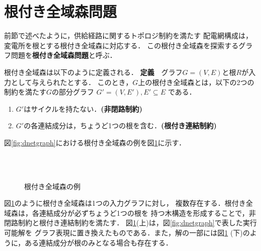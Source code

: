 \section{根付き全域森問題}\label{chap:problem}

前節で述べたように，供給経路に関するトポロジ制約を満たす
配電網構成は，変電所を根とする根付き全域森に対応する．
この根付き全域森を探索するグラフ問題を\textbf{根付き全域森問題}と呼ぶ．

根付き全域森は以下のように定義される．\cite{Minato:dnet:netuki}
\newline
\textbf{定義}~~グラフ$G=(V,E)$と根$R$が入力として与えられたとする．
このとき，$G$上の根付き全域森とは，以下の2つの制約を満たす$G$の部分グラフ
$G'=(V,E'), E' \subseteq E$ である．
\begin{enumerate}
 \item $G'$はサイクルを持たない．\textbf{(非閉路制約)}
 \item $G'$の各連結成分は，ちょうど1つの根を含む．\textbf{(根付き連結制約)}
\end{enumerate}
図\ref{fig:dnetgraph}における根付き全域森の例を図\ref{fig:netuki}に示す．

\begin{figure}[htbp]
  \centering
  \scalebox{0.8}{}
 \mbox{}\\ \mbox{}\\
  \centering
  \scalebox{0.8}{}
 \caption{根付き全域森の例}
 \label{fig:netuki}
\end{figure}

図\ref{fig:netuki}のように根付き全域森は1つの入力グラフに対し，
複数存在する．根付き全域森は，各連結成分が必ずちょうど1つの根を
持つ木構造を形成することで，非閉路制約と根付き連結制約を満たす．
図\ref{fig:netuki}(上)は，図\ref{fig:dnetgraph}で表した実行可能解を
グラフ表現に置き換えたものである．また，解の一部には図\ref{fig:netuki}
(下)のように，ある連結成分が根のみとなる場合も存在する．
